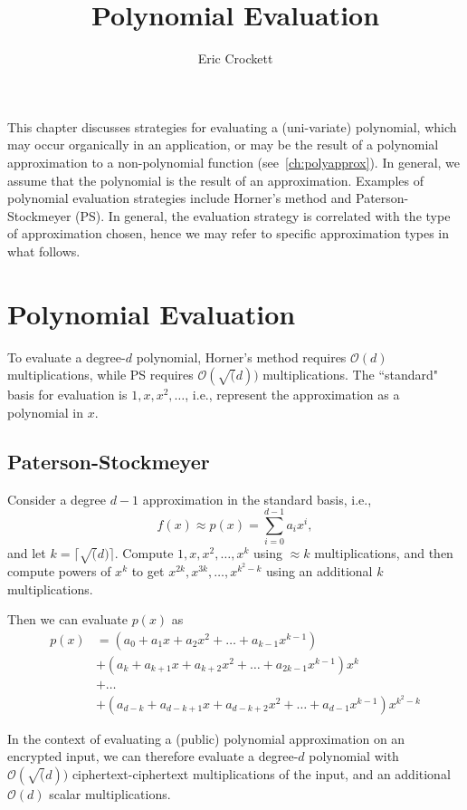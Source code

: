 \documentclass[../fheimpl.tex]{subfiles}
\title{Polynomial Evaluation}
\author{Eric Crockett}
\begin{document}
	\ifcompileasbook
	\else
	\maketitle
	\listoffixmes
	\fi

This chapter discusses strategies for evaluating a (uni-variate) polynomial, which may occur organically in an application, or may be the result of a polynomial approximation to a non-polynomial function (see~\cref{ch:polyapprox}). In general, we assume that the polynomial is the result of an approximation. Examples of polynomial evaluation strategies include Horner's method and Paterson-Stockmeyer (PS). 
In general, the evaluation strategy is correlated with the type of approximation chosen, hence we may refer to specific approximation types in what follows.


\section{Polynomial Evaluation}
To evaluate a degree-$d$ polynomial, Horner's method requires $\mathcal{O}(d)$ multiplications, while PS requires $\mathcal{O}(\sqrt(d))$ multiplications. The ``standard" basis for evaluation is ${1, x, x^2, \ldots}$, i.e., represent the approximation as a polynomial in $x$.

\subsection{Paterson-Stockmeyer}
Consider a degree $d-1$ approximation in the standard basis, i.e.,
\[f(x)\approx p(x) = \sum_{i=0}^{d-1} a_ix^i,\] 
and let $k=\lceil\sqrt(d)\rceil$. Compute $1, x, x^2, \ldots, x^{k}$ using $\approx k$ multiplications, and then compute powers of $x^k$ to get $x^{2k}, x^{3k}, \ldots, x^{k^2-k}$ using an additional $k$ multiplications.

Then we can evaluate $p(x)$ as
\begin{align*}
	p(x) & = (a_0 + a_1x + a_2x^2 + \ldots + a_{k-1}x^{k-1}) \\
   & + (a_k + a_{k+1}x + a_{k+2}x^2 + \ldots + a_{2k-1}x^{k-1})x^k \\
   & + \ldots \\
   & + (a_{d-k} + a_{d-k+1}x + a_{d-k+2}x^2 + \ldots + a_{d-1}x^{k-1})x^{k^2-k}
\end{align*}

In the context of evaluating a (public) polynomial approximation on an encrypted input, we can therefore evaluate a degree-$d$ polynomial with $\mathcal{O}(\sqrt(d))$ ciphertext-ciphertext multiplications of the input, and an additional $\mathcal{O}(d)$  scalar multiplications.
\end{document}

